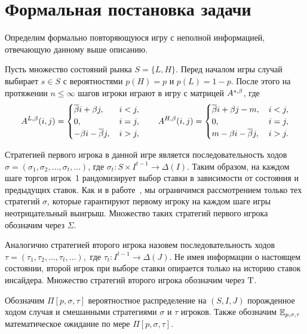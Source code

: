 {\section{Формальная постановка задачи}\label{ch1:formal-def}

Определим формально повторяющуюся игру с неполной информацией, отвечающую
данному выше описанию. 

Пусть множество состояний рынка $S = \{L, H\}$. Перед началом игры случай
выбирает $s \in S $ с вероятностями $p(H) = p$ и $p(L) = 1 - p$. После этого на
протяжении $n \leq \infty$ шагов игроки играют в игру с матрицей $A^{s,\beta}$,
где
\begin{equation*}
  A^{L,\beta}(i, j) = \begin{cases}
    \overline{\beta} i + \beta j, &\, i < j, \\
    0, &\, i = j, \\
    -\beta i - \overline{\beta} j, &\, i > j,
  \end{cases}
  \qquad
  A^{H,\beta}(i, j) = \begin{cases}
    \overline{\beta} i + \beta j - m, &\, i < j, \\
    0, &\, i = j, \\
    m - \beta i - \overline{\beta} j, &\, i > j.
  \end{cases}
\end{equation*}


Стратегией первого игрока в данной игре является последовательность ходов %
$\sigma = (\sigma_1, \sigma_2, \ldots, \sigma_t, \ldots)$, где %
$\sigma_t: S \times I^{t-1} \rightarrow \Delta(I)$. Таким образом, на каждом
шаге торгов игрок~1 рандомизирует выбор ставки в зависимости от состояния и
предыдущих ставок. Как и в работе~\cite{domansky07}, мы ограничимся
рассмотрением только тех стратегий $\sigma$, которые гарантируют первому игроку
на каждом шаге игры неотрицательный выигрыш. Множество таких стратегий первого
игрока обозначим через $\Sigma$.

Аналогично стратегией второго игрока назовем последовательность ходов $\tau =
(\tau_1, \tau_2, \ldots, \tau_t, \ldots),$ где $\tau_t: I^{t-1} \rightarrow
\Delta(J)$. Не имея информации о настоящем состоянии, второй игрок при выборе
ставки опирается только на историю ставок инсайдера. Множество стратегий второго
игрока обозначим через $\mathrm{T}$.

Обозначим $\Pi[p, \sigma, \tau]$ вероятностное распределение на $(S, I, J)$
порожденное ходом случая и смешанными стратегиями $\sigma$ и $\tau$ игроков.
Также обозначим $\operatorname{\mathbb{E}}_{p,\sigma,\tau}$ математическое ожидание по мере $\Pi[p,
\sigma, \tau]$.

}
